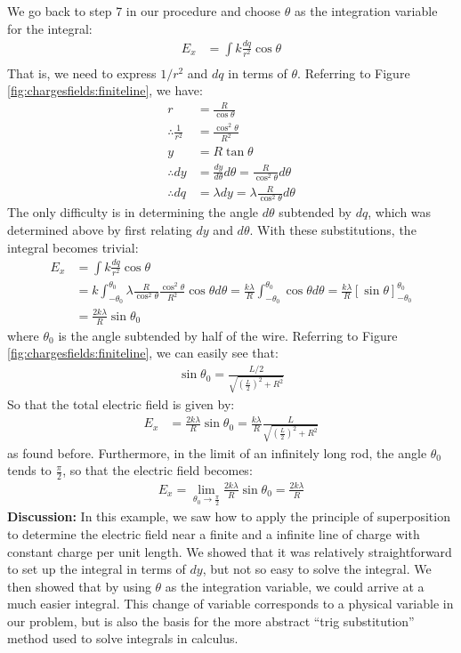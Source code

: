 \begin{example}
We go back to step 7 in our procedure and choose $\theta$ as the integration variable for the integral:
\begin{align*}
E_x &=\int k\frac{dq}{r^2}\cos\theta\\
\end{align*}
That is, we need to express $1/r^2$ and $dq$ in terms of $\theta$. Referring to Figure \ref{fig:chargesfields:finiteline}, we have:
\begin{align*}
r &= \frac{R}{\cos\theta}\\
\therefore \frac{1}{r^2}&=\frac{\cos^2\theta}{R^2}\\
y &= R\tan\theta\\
\therefore dy &= \frac{dy}{d\theta}d\theta=\frac{R}{\cos^2\theta}d\theta\\
\therefore dq &= \lambda dy =\lambda\frac{R}{\cos^2\theta}d\theta
\end{align*}
The only difficulty is in determining the angle $d\theta$ subtended by $dq$, which was determined above by first relating $dy$ and $d\theta$. With these substitutions, the integral becomes trivial:
\begin{align*}
E_x &=\int k\frac{dq}{r^2}\cos\theta\\
&=k\int_{-\theta_0}^{\theta_0} \lambda\frac{R}{\cos^2\theta} \frac{\cos^2\theta}{R^2} \cos\theta d\theta=\frac{k\lambda}{R}\int_{-\theta_0}^{\theta_0}\cos\theta d\theta=\frac{k\lambda}{R}\left[\sin\theta \right]_{-\theta_0}^{\theta_0}\\
&=\frac{2k\lambda}{R}\sin\theta_0
\end{align*}
where $\theta_0$ is the angle subtended by half of the wire. Referring to Figure \ref{fig:chargesfields:finiteline}, we can easily see that:
\begin{align*}
\sin\theta_0=\frac{L/2}{\sqrt{\left(\frac{L}{2}\right)^2+R^2}}
\end{align*}
So that the total electric field is given by:
\begin{align*}
E_x &=\frac{2k\lambda}{R}\sin\theta_0=\frac{k\lambda}{R}\frac{L}{\sqrt{\left(\frac{L}{2}\right)^2+R^2}}
\end{align*}
as found before. Furthermore, in the limit of an infinitely long rod, the angle $\theta_0$ tends to $\frac{\pi}{2}$, so that the electric field becomes:
\begin{align*}
E_x=\lim_{\theta_0\to\frac{\pi}{2}}\frac{2k\lambda}{R}\sin\theta_0=\frac{2k\lambda}{R}
\end{align*}
\textbf{Discussion:} In this example, we saw how to apply the principle of superposition to determine the electric field near a finite and a infinite line of charge with constant charge per unit length. We showed that it was relatively straightforward to set up the integral in terms of $dy$, but not so easy to solve the integral. We then showed that by using $\theta$ as the integration variable, we could arrive at a much easier integral. This change of variable corresponds to a physical variable in our problem, but is also the basis for the more abstract ``trig substitution'' method used to solve integrals in calculus.
\end{example}

